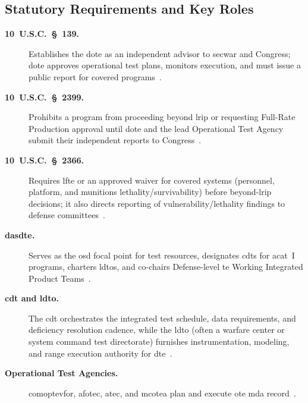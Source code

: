 \documentclass[../main.tex]{subfiles}
\begin{document}
\subsection{Statutory Requirements and Key Roles}
\begin{description}
  \item[\textbf{10~U.S.C.~\S~139.}] Establishes the \ac{dote} as an independent advisor to \ac{secwar} and Congress; \ac{dote} approves operational test plans, monitors execution, and must issue a public report for covered programs~\autocite{USC-10-139}.
  \item[\textbf{10~U.S.C.~\S~2399.}] Prohibits a program from proceeding beyond \ac{lrip} or requesting Full-Rate Production approval until \ac{dote} and the lead Operational Test Agency submit their independent reports to Congress~\autocite{USC-10-2399}.
  \item[\textbf{10~U.S.C.~\S~2366.}] Requires \ac{lfte} or an approved waiver for covered systems (personnel, platform, and munitions lethality/survivability) before beyond-\ac{lrip} decisions; it also directs reporting of vulnerability/lethality findings to defense committees~\autocite{USC-10-2366}.
  \item[\textbf{\ac{dasdte}.}] Serves as the \ac{osd} focal point for test resources, designates \acp{cdt} for \ac{acat}~I programs, charters \acp{ldto}, and co-chairs Defense-level \ac{te} Working Integrated Product Teams~\autocite{DoDI5000-89}.
  \item[\textbf{\ac{cdt} and \ac{ldto}.}] The \ac{cdt} orchestrates the integrated test schedule, data requirements, and deficiency resolution cadence, while the \ac{ldto} (often a warfare center or system command test directorate) furnishes instrumentation, modeling, and range execution authority for \ac{dte}~\autocite{DoDI5000-89}.
  \item[\textbf{Operational Test Agencies.}] \ac{comoptevfor}, \ac{afotec}, \ac{atec}, and \ac{mcotea} plan and execute \ac{ote} \ac{mda} record~\autocite{edo-3-5-6-test-eval-part-ii-2025}.
\end{description}
\end{document}
